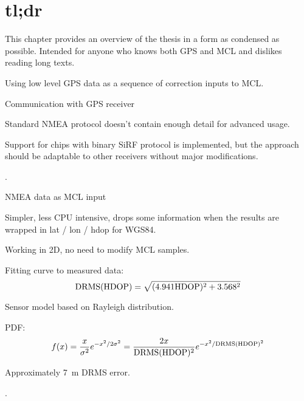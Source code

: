 \chapter{tl;dr}
This chapter provides an overview of the thesis in a form as condensed as possible.
Intended for anyone who knows both GPS and MCL and dislikes reading long texts.

\begin{compactitem}
\item
Using low level GPS data as a sequence of correction inputs to MCL.

\item
Communication with GPS receiver
\begin{compactitem}
    \item Standard NMEA protocol doesn't contain enough detail for advanced usage.
    \item Support for \sirf chips with binary SiRF protocol is implemented, but the
    approach should be adaptable to other receivers without major modifications.
    \item {}.
\end{compactitem}

\item
NMEA data as MCL input
\begin{compactitem}
    \item Simpler, less CPU intensive, drops some information when the results are
    wrapped in lat / lon / hdop for WGS84.
    \item Working in 2D, no need to modify MCL samples.
    \item
        Fitting curve to measured data:
        \begin{equation*}
            \mathrm{DRMS}(\mathrm{HDOP}) = \sqrt{(\num{4.941}\mathrm{HDOP})^2 + \num{3.568}^2}
        \end{equation*}
    \item Sensor model based on Rayleigh distribution.
    \item PDF:
        \begin{equation*}
            f(x) = \frac{x}{\sigma^2}e^{-x^2/2\sigma^2} =
            \frac{2x}{\mathrm{DRMS}(\mathrm{HDOP})^2}e^{-x^2/\mathrm{DRMS}(\mathrm{HDOP})^2}
        \end{equation*}
    \item Approximately \SI{7}{\meter} DRMS error.
    \item {}.
\end{compactitem}


\end{compactitem}
